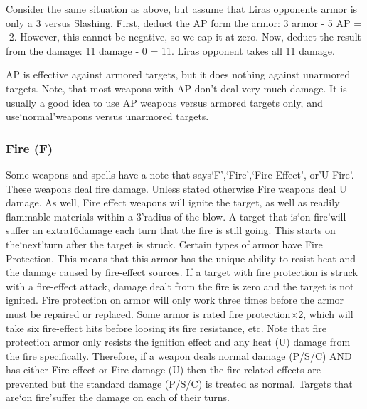 \documentclass[twoside]{book}
\begin{document}
  

  

  
    {  
    Consider the same situation as above, but assume that Liras opponents armor is only a 3 versus Slashing. First, deduct the AP form the armor: 3 armor - 5 AP = -2. However, this cannot be negative, so we cap it at zero. Now, deduct the result from the damage: 11 damage - 0 = 11. Liras opponent takes all 11 damage.
    }
  
    {  
    AP is effective against armored targets, but it does nothing against unarmored targets. Note, that most weapons with AP don't deal very much damage. It is usually a good idea to use AP weapons versus armored targets only, and use`normal'weapons versus unarmored targets.
    }
  
    

\subsubsection{Fire (F)}
    
    {  
    Some weapons and spells have a note that says`F',`Fire',`Fire Effect', or'U Fire'. These weapons deal fire damage. Unless stated otherwise Fire weapons deal U damage. As well, Fire effect weapons will ignite the target, as well as readily flammable materials within a 3'radius of the blow. A target that is`on fire'will suffer an extra\ensuremath{1}\ensuremath{6}\ensuremath{}damage each turn that the fire is still going. This starts on the`next'turn after the target is struck. Certain types of armor have Fire Protection. This means that this armor has the unique ability to resist heat and the damage caused by fire-effect sources. If a target with fire protection is struck with a fire-effect attack, damage dealt from the fire is zero and the target is not ignited. Fire protection on armor will only work three times before the armor must be repaired or replaced. Some armor is rated fire protection\begin{math}\times \end{math}2, which will take six fire-effect hits before loosing its fire resistance, etc. Note that fire protection armor only resists the ignition effect and any heat (U) damage from the fire specifically. Therefore, if a weapon deals normal damage (P/S/C) AND has either Fire effect or Fire damage (U) then the fire-related effects are prevented but the standard damage (P/S/C) is treated as normal. Targets that are`on fire'suffer the damage on each of their turns.
    }
  
\end{document}
